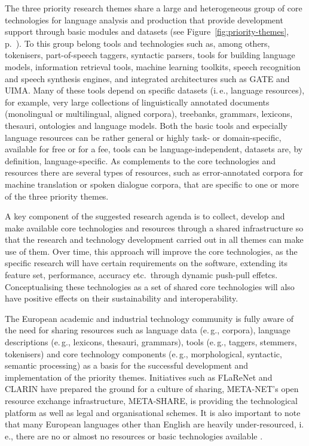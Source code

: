 \documentclass[10pt, plain]{../../metanetpaper}
\begin{document}
\begin{multicols}{2}

The three priority research themes share a large and heterogeneous group of core technologies for language analysis and production that provide development support through basic modules and datasets (see Figure~\ref{fig:priority-themes}, p.~\pageref{fig:priority-themes}). To this group belong tools and technologies such as, among others, tokenisers, part-of-speech taggers, syntactic parsers, tools for building language models, information retrieval tools, machine learning toolkits, speech recognition and speech synthesis engines, and integrated architectures such as GATE and UIMA. Many of these tools depend on specific datasets (i.\,e., language resources), for example, very large collections of linguistically annotated documents (monolingual or multilingual, aligned corpora), treebanks, grammars, lexicons, thesauri, ontologies and language models. Both the basic tools and especially language resources can be rather general or highly task- or domain-specific, available for free or for a fee, tools can be language-independent, datasets are, by definition, language-specific. As complements to the core technologies and resources there are several types of resources, such as error-annotated corpora for machine translation or spoken dialogue corpora, that are specific to one or more of the three priority themes.

A key component of the suggested research agenda is to collect, develop and make available core technologies and resources through a shared infrastructure so that the research and technology development carried out in all themes can make use of them. Over time, this approach will improve the core technologies, as the specific research will have certain requirements on the software, extending its feature set, performance, accuracy etc.~through dynamic push-pull effetcs. Conceptualising these technologies as a set of shared core technologies will also have positive effects on their sustainability and interoperability.

The European academic and industrial technology community is fully aware of the need for sharing resources such as language data (e.\,g., corpora), language descriptions (e.\,g., lexicons, thesauri, grammars), tools (e.\,g., taggers, stemmers, tokenisers) and core technology components (e.\,g., morphological, syntactic, semantic processing) as a basis for the successful development and implementation of the priority themes. Initiatives such as FLaReNet \cite{flarenetsra2011} and CLARIN have prepared the ground for a culture of sharing, META-NET's open resource exchange infrastructure, META-SHARE, is providing the technological platform as well as legal and organisational schemes. It is also important to note that many European languages other than English are heavily under-resourced, i.\,e., there are no or almost no resources or basic technologies available \cite{LWP2012}.


\end{multicols}
\end{document}
